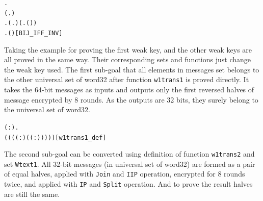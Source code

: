 \documentclass{article}
\begin{document}
\begin{alltt}
\HOLTokenTurnstile{} \HOLSymConst{\HOLTokenForall{}}  .
         \HOLSymConst{\HOLTokenEquiv{}}
     (\HOLSymConst{\HOLTokenForall{}}.  \HOLSymConst{\HOLTokenIn{}}  \HOLSymConst{\HOLTokenImp{}}   \HOLSymConst{\HOLTokenIn{}} ) \HOLSymConst{\HOLTokenConj{}}
     \HOLSymConst{\HOLTokenExists{}}. (\HOLSymConst{\HOLTokenForall{}}.  \HOLSymConst{\HOLTokenIn{}}  \HOLSymConst{\HOLTokenImp{}}   \HOLSymConst{\HOLTokenIn{}} ) \HOLSymConst{\HOLTokenConj{}} (\HOLSymConst{\HOLTokenForall{}}.  \HOLSymConst{\HOLTokenIn{}}  \HOLSymConst{\HOLTokenImp{}}  ( ) \HOLSymConst{=} ) \HOLSymConst{\HOLTokenConj{}}
         \HOLSymConst{\HOLTokenForall{}}.  \HOLSymConst{\HOLTokenIn{}}  \HOLSymConst{\HOLTokenImp{}}  ( ) \HOLSymConst{=} \hfill{[BIJ_IFF_INV]}
\end{alltt}

Taking the example for proving the first weak key, and the other weak keys are all proved in the same way. Their corresponding
sets and functions just change the weak key used.
The first sub-goal that all elements in messages set belongs to the other universal set of word32 after function \verb|w1trans1| is
proved directly. It takes the 64-bit messages as inputs and outputs only the first reversed halves of message encrypted by 8
rounds. As the outputs are 32 bits, they surely belong to the universal set of word32.

\begin{alltt}
\HOLTokenTurnstile{} \HOLSymConst{\HOLTokenForall{}}( :).
       \HOLSymConst{=}
      ( ( ( ( :) (  ( :)) )))\hfill{[w1trans1_def]}
\end{alltt}

The second sub-goal can be converted using definition of function \verb|w1trans2| and set \verb|Wtext1|. All 32-bit messages
(in universal set of word32) are formed as a pair of equal halves, applied with \verb|Join| and \verb|IIP| operation, encrypted
for 8 rounds twice, and applied with \verb|IP| and \verb|Split| operation. And to prove the result halves are still the same.
\end{document}
